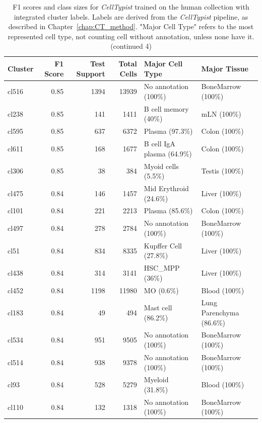 \begin{table}[ht!]
\scriptsize
\caption[F1 scores and class sizes for \textit{CellTypist} trained on the human collection with integrated cluster labels (continued 4)]{F1 scores and class sizes for \textit{CellTypist} trained on the human collection with integrated cluster labels. Labels are derived from the \textit{CellTypist} pipeline, as described in Chapter~\ref{chap:CT_method}. "Major Cell Type" refers to the most represented cell type, not counting cell without annotation, unless none have it. (continued 4)}
\centering
\label{table:tab_HAmodelclust4 (continued 5)}
\begin{tabular}{lrrrll}
  \toprule
Cluster & F1 Score & Test Support & Total Cells & Major Cell Type & Major Tissue \\ 
  \midrule
  cl516 & 0.85 & 1394 & 13939 & No annotation (100\%) & BoneMarrow (100\%) \\ 
  cl238 & 0.85 & 141 & 1411 & B cell memory (40\%) & mLN (100\%) \\ 
  cl595 & 0.85 & 637 & 6372 & Plasma (97.3\%) & Colon (100\%) \\ 
  cl611 & 0.85 & 168 & 1677 & B cell IgA plasma (64.9\%) & Colon (100\%) \\ 
  cl306 & 0.85 &  38 & 384 & Myoid cells (5.5\%) & Testis (100\%) \\ 
  cl475 & 0.84 & 146 & 1457 & Mid Erythroid (24.6\%) & Liver (100\%) \\ 
  cl101 & 0.84 & 221 & 2213 & Plasma (85.6\%) & Colon (100\%) \\ 
  cl497 & 0.84 & 278 & 2784 & No annotation (100\%) & BoneMarrow (100\%) \\ 
  cl51 & 0.84 & 834 & 8335 & Kupffer Cell (27.8\%) & Liver (100\%) \\ 
  cl438 & 0.84 & 314 & 3141 & HSC\_MPP (36\%) & Liver (100\%) \\ 
  cl452 & 0.84 & 1198 & 11980 & MO (0.6\%) & Blood (100\%) \\ 
  cl183 & 0.84 &  49 & 494 & Mast cell (86.2\%) & Lung Parenchyma (86.6\%) \\ 
  cl534 & 0.84 & 951 & 9505 & No annotation (100\%) & BoneMarrow (100\%) \\ 
  cl514 & 0.84 & 938 & 9378 & No annotation (100\%) & BoneMarrow (100\%) \\ 
  cl93 & 0.84 & 528 & 5279 & Myeloid (31.8\%) & Blood (100\%) \\ 
  cl110 & 0.84 & 132 & 1318 & No annotation (100\%) & BoneMarrow (100\%) \\ 

\end{tabular}
\end{table}
